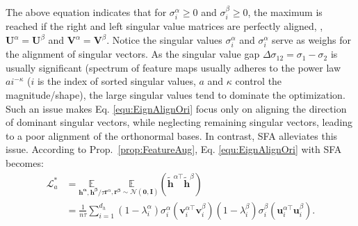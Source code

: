 \noindent 
The above equation indicates that for $\sigma^\alpha_i\geq0$ and $\sigma^\beta_i\geq0$, the maximum is reached if  the right and left singular value matrices are perfectly aligned, \ie, $\mathbf{U}^\alpha\! = \!\mathbf{U}^\beta$ and $\mathbf{V}^\alpha\! =\! \mathbf{V}^\beta$. Notice the singular values $\sigma^\alpha_i$ and $\sigma^\alpha_i$ serve as weighs for the alignment of singular vectors. %
As the singular value gap $\Delta\sigma_{12}=\sigma_1-\sigma_2$ is usually significant (spectrum of feature maps usually adheres to the power law $ai^{-\kappa}$ ($i$ is the index of sorted singular values, $a$ and $\kappa$ control the magnitude/shape), the large singular values tend to dominate the optimization. Such an issue makes  Eq. \eqref{equ:EignAlignOri} focus only on aligning the direction of dominant singular vectors, while neglecting remaining singular vectors, leading to a poor alignment of the orthonormal bases. In contrast,  SFA alleviates this issue. According to Prop.~\ref{prop:FeatureAug}, Eq. \eqref{equ:EignAlignOri} with SFA becomes:
%
\vspace{-0.1cm}
\begin{equation}
\label{equ:EignAlignRefine}
\!\!\!\begin{aligned}
\mathcal{L}^*_{a}& = \underset{\mathbf{h^\alpha},\mathbf{h^\beta}/\tau}{\mathbb{E}}\underset{\mathbf{r}^\alpha,\mathbf{r^\beta\sim \mathcal{N}(0,\mathbf{I})}}{\mathbb{E}}(\tilde{\mathbf{h}}^{\alpha\top}\tilde{\mathbf{h}}^\beta) \\[-4pt]
&=\frac{1}{n\tau}\sum_{i=1}^{d_h} (1\!-\!\lambda_i^\alpha){\sigma}^\alpha_i({\mathbf{v}}_{i}^{\alpha\top}{\mathbf{v}}^\beta_{i})(1\!-\!\lambda_i^\beta){\sigma}^{\beta}_i({{\mathbf{u}}}^{\alpha\top}_{i}{\mathbf{u}}^{\beta}_{i}).%
\end{aligned}\!
\end{equation}
%

